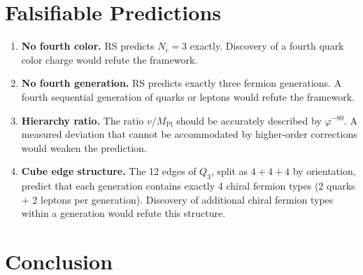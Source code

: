 \documentclass[12pt,a4paper]{article}
\theoremstyle{definition}
\theoremstyle{remark}
\begin{document}
\section{Falsifiable Predictions}
\label{sec:falsify}

\begin{enumerate}
  \item \textbf{No fourth color.}  RS predicts $N_c = 3$ exactly.
  Discovery of a fourth quark color charge would refute the framework.

  \item \textbf{No fourth generation.}  RS predicts exactly three
  fermion generations.  A fourth sequential generation of quarks or
  leptons would refute the framework.

  \item \textbf{Hierarchy ratio.}  The ratio $v/M_{\mathrm{Pl}}$
  should be accurately described by $\varphi^{-80}$.  A measured
  deviation that cannot be accommodated by higher-order corrections
  would weaken the prediction.

  \item \textbf{Cube edge structure.}  The 12 edges of $Q_3$, split
  as $4 + 4 + 4$ by orientation, predict that each generation
  contains exactly 4 chiral fermion types (2 quarks $+$ 2 leptons
  per generation).  Discovery of additional chiral fermion types
  within a generation would refute this structure.
\end{enumerate}

\section{Conclusion}
\label{sec:conclusion}
\end{document}
